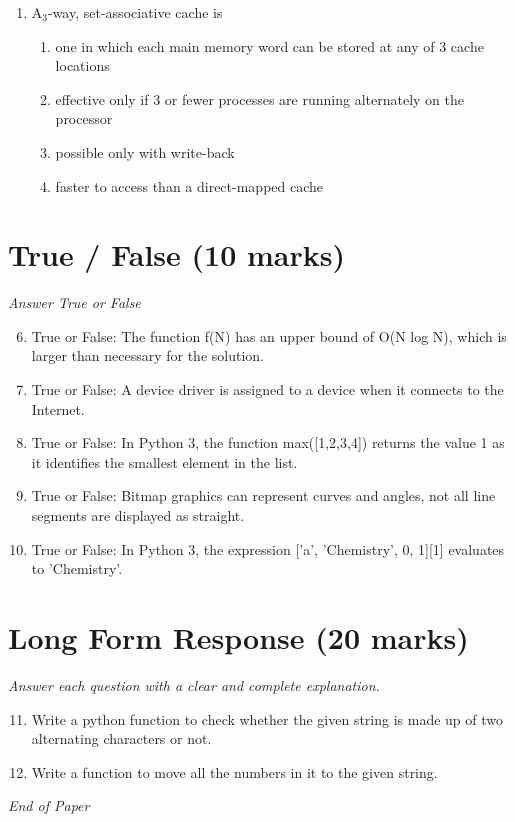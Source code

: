 \documentclass[12pt]{article}
\begin{document}
\begin{enumerate}[label=\arabic*.]
\begin{enumerate}[label=(\alph*)]
\end{enumerate}
\item A$_{3}$-way, set-associative cache is
\begin{enumerate}[label=(\alph*)]
    \item one in which each main memory word can be stored at any of 3 cache locations
    \item effective only if 3 or fewer processes are running alternately on the processor
    \item possible only with write-back
    \item faster to access than a direct-mapped cache
\end{enumerate}
\end{enumerate}

\section*{True / False (10 marks)}
\textit{Answer True or False}
\begin{enumerate}[label=\arabic*.]
\setcounter{enumi}{5}
\item True or False: The function f(N) has an upper bound of O(N log N), which is larger than necessary for the solution.
\item True or False: A device driver is assigned to a device when it connects to the Internet.
\item True or False: In Python 3, the function max([1,2,3,4]) returns the value 1 as it identifies the smallest element in the list.
\item True or False: Bitmap graphics can represent curves and angles, not all line segments are displayed as straight.
\item True or False: In Python 3, the expression ['a', 'Chemistry', 0, 1][1] evaluates to 'Chemistry'.
\end{enumerate}

\section*{Long Form Response (20 marks)}
\textit{Answer each question with a clear and complete explanation.}
\begin{enumerate}[label=\arabic*.]
\setcounter{enumi}{10}
\item Write a python function to check whether the given string is made up of two alternating characters or not.
\item Write a function to move all the numbers in it to the given string.
\end{enumerate}

\vfill
\noindent\textit{End of Paper}
\end{document}
